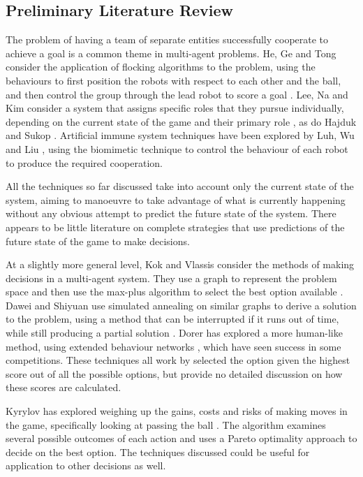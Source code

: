 \documentclass[a4paper,10pt]{article}
\begin{document}
\subsection{Preliminary Literature Review}

The problem of having a team of separate entities successfully cooperate to achieve a goal is a common theme in multi-agent problems.  He, Ge and Tong consider the application of flocking algorithms to the problem, using the behaviours to first position the robots with respect to each other and the ball, and then control the group through the lead robot to score a goal \cite{taskBasedFlocking}.  Lee, Na and Kim consider a system that assigns specific roles that they pursue individually, depending on the current state of the game and their primary role \cite{taskRoleSelectionStrategy}, as do Hajduk and Sukop \cite{multiagentsDynamicBoxChange}. Artificial immune system techniques have been explored by Luh, Wu and Liu \cite{artificialImmuneSystemCooperation}, using the biomimetic technique to control the behaviour of each robot to produce the required cooperation.

All the techniques so far discussed take into account only the current state of the system, aiming to manoeuvre to take advantage of what is currently happening without any obvious attempt to predict the future state of the system.  There appears to be little literature on complete strategies that use predictions of the future state of the game to make decisions.

At a slightly more general level, Kok and Vlassis consider the methods of making decisions in a multi-agent system.  They use a graph to represent the problem space and then use the max-plus algorithm to select the best option available \cite{maxPlusAlgorithm}.  Dawei and Shiyuan use simulated annealing on similar graphs to derive a solution to the problem, using a method that can be interrupted if it runs out of time, while still producing a partial solution \cite{simulatedAnnealingDecisionMaking}.  Dorer has explored a more human-like method, using extended behaviour networks \cite{modellingHumanDecisionMaking}, which have seen success in some competitions.  These techniques all work by selected the option given the highest score out of all the possible options, but provide no detailed discussion on how these scores are calculated.

Kyrylov has explored weighing up the gains, costs and risks of making moves in the game, specifically looking at passing the ball \cite{balancingGainsRisksCostsPassing}.  The algorithm examines several possible outcomes of each action and uses a Pareto optimality approach to decide on the best option.  The techniques discussed could be useful for application to other decisions as well.
\end{document}
